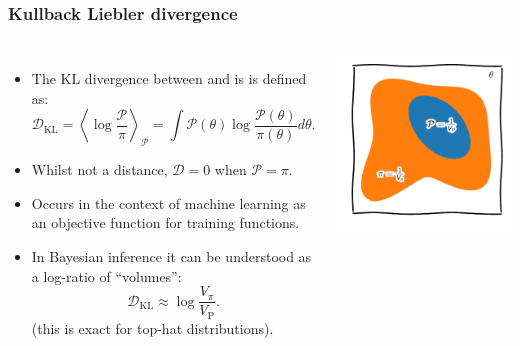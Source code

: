 \documentclass[aspectratio=169]{beamer}
\newcommand{\av}[2][]{\left\langle #2\right\rangle_{#1}}
\begin{document}
\begin{frame}
    \frametitle{Kullback Liebler divergence}
    \begin{columns}
        \begin{itemize}
            \item The KL divergence between  and  is is defined as:
                \[\mathcal{D}_\text{KL} = \av[\mathcal{P}]{\log\frac{\mathcal{P}}{\pi}} = \int \mathcal{P}(\theta) \log \frac{\mathcal{P}(\theta)}{\pi(\theta)}d\theta.\]
            \item Whilst not a distance, $\mathcal{D}=0$ when $\mathcal{P}=\pi$.
            \item Occurs in the context of machine learning as an objective function for training functions.
            \item In Bayesian inference it can be understood as a log-ratio of ``volumes'':
                \[ \mathcal{D}_\text{KL} \approx \log \frac{V_\pi}{V_\text{P}}.\]
                (this is exact for top-hat distributions).
        \end{itemize}
        \includegraphics{figures/volumes.pdf}
    \end{columns}
\end{frame}
\end{document}

